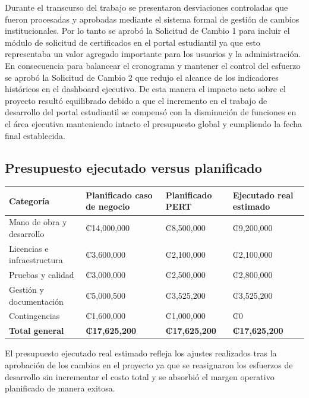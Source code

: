 \documentclass[11pt,spanish]{article}
\begin{document}
Durante el transcurso del trabajo se presentaron desviaciones controladas que fueron procesadas y aprobadas mediante el sistema formal de gestión de cambios institucionales. Por lo tanto se aprobó la Solicitud de Cambio 1 para incluir el módulo de solicitud de certificados en el portal estudiantil ya que esto representaba un valor agregado importante para los usuarios y la administración. En consecuencia para balancear el cronograma y mantener el control del esfuerzo se aprobó la Solicitud de Cambio 2 que redujo el alcance de los indicadores históricos en el dashboard ejecutivo. De esta manera el impacto neto sobre el proyecto resultó equilibrado debido a que el incremento en el trabajo de desarrollo del portal estudiantil se compensó con la disminución de funciones en el área ejecutiva manteniendo intacto el presupuesto global y cumpliendo la fecha final establecida.

\subsection{Presupuesto ejecutado versus planificado}

\begin{table}[H]
\centering
\begin{tabularx}{\textwidth}{p{5cm} Y Y Y}
\toprule
\textbf{Categoría} & \textbf{Planificado caso de negocio} & \textbf{Planificado PERT} & \textbf{Ejecutado real estimado} \\
\midrule
Mano de obra y desarrollo & ₡14,000,000 & ₡8,500,000 & ₡9,200,000 \\
Licencias e infraestructura & ₡3,600,000 & ₡2,100,000 & ₡2,100,000 \\
Pruebas y calidad & ₡3,000,000 & ₡2,500,000 & ₡2,800,000 \\
Gestión y documentación & ₡5,000,500 & ₡3,525,200 & ₡3,525,200 \\
Contingencias & ₡1,600,000 & ₡1,000,000 & ₡0 \\
\midrule
\textbf{Total general} & \textbf{₡17,625,200} & \textbf{₡17,625,200} & \textbf{₡17,625,200} \\
\bottomrule
\end{tabularx}
\end{table}

El presupuesto ejecutado real estimado refleja los ajustes realizados tras la aprobación de los cambios en el proyecto ya que se reasignaron los esfuerzos de desarrollo sin incrementar el costo total y se absorbió el margen operativo planificado de manera exitosa. 
\end{document}
